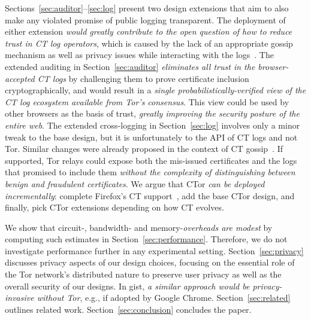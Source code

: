 Sections~\ref{sec:auditor}--\ref{sec:log} present two design extensions that
aim to also make any violated promise of public logging transparent.  The
deployment of either extension
	\emph{would greatly contribute to the open question of how to reduce trust
	in CT log operators},
which is caused by the lack of an appropriate gossip mechanism as well as
privacy issues while interacting with the
logs~\cite{minimal-gossip,nordberg,ct-with-privacy}.
The extended auditing in Section~\ref{sec:auditor}
	\emph{eliminates all trust in the browser-accepted CT logs}
by challenging them to prove certificate inclusion cryptographically, and would
result in a
	\emph{single probabilistically-verified view of the CT log ecosystem
	available from Tor's consensus}.
This view could be used by other browsers as the basis of trust,
	\emph{greatly improving the security posture of the entire web}.
The extended cross-logging in Section~\ref{sec:log} involves only a minor tweak
to the base design, but it is unfortunately to the API of CT logs and not Tor.
Similar changes were already proposed in the context of CT
gossip~\cite{minimal-gossip}.  If supported, Tor relays could expose both the
mis-issued certificates and the logs that promised to include them \emph{without
the complexity of distinguishing between benign and fraudulent certificates}.
We argue that CTor \emph{can be deployed incrementally}:
	complete Firefox's CT support~\cite{ffct},
	add the base CTor design, and finally,
	pick CTor extensions depending on how CT evolves.

We show that circuit-, bandwidth- and memory-\emph{overheads are modest} by
computing such estimates in Section~\ref{sec:performance}.  Therefore, we
do not investigate performance further in any experimental setting.
Section~\ref{sec:privacy} discusses privacy aspects of our design choices,
focusing on the essential role of the Tor network's distributed nature
to preserve user privacy as well as the overall security of our designs.  In
gist, \emph{a similar approach would be privacy-invasive without Tor}, e.g.,
if adopted by Google Chrome.
Section~\ref{sec:related} outlines related work.
Section~\ref{sec:conclusion} concludes the paper.
